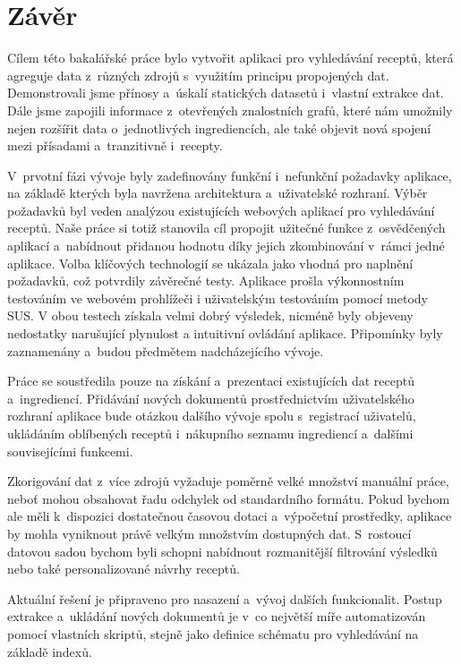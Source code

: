 \chapter*{Závěr}

Cílem této bakalářské práce bylo vytvořit aplikaci pro vyhledávání receptů, která agreguje data z~různých zdrojů s~využitím principu propojených dat. Demonstrovali jsme přínosy a~úskalí statických datasetů i~vlastní extrakce dat. Dále jsme zapojili informace z~otevřených znalostních grafů, které nám umožnily nejen rozšířit data o~jednotlivých ingrediencích, ale také objevit nová spojení mezi přísadami a~tranzitivně i~recepty.

V~prvotní fázi vývoje byly zadefinovány funkční i~nefunkční požadavky aplikace, na základě kterých byla navržena architektura a~uživatelské rozhraní. Výběr požadavků byl veden analýzou existujících webových aplikací pro vyhledávání receptů. Naše práce si totiž stanovila cíl propojit užitečné funkce z~osvědčených aplikací a~nabídnout přidanou hodnotu díky jejich zkombinování v~rámci jedné aplikace. Volba klíčových technologií se ukázala jako vhodná pro naplnění požadavků, což potvrdily závěrečné testy. Aplikace prošla výkonnostním testováním ve webovém prohlížeči i uživatelským testováním pomocí metody SUS. V obou testech získala velmi dobrý výsledek, nicméně byly objeveny nedostatky narušující plynulost a intuitivní ovládání aplikace. Připomínky byly zaznamenány a~budou předmětem nadcházejícího vývoje.

Práce se soustředila pouze na získání a~prezentaci existujících dat receptů a~ingrediencí. Přidávání nových dokumentů prostřednictvím uživatelského rozhraní aplikace bude otázkou dalšího vývoje spolu s~registrací uživatelů, ukládáním oblíbených receptů i~nákupního seznamu ingrediencí a~dalšími souvisejícími funkcemi.

Zkorigování dat z~více zdrojů vyžaduje poměrně velké množství manuální práce, neboť mohou obsahovat řadu odchylek od standardního formátu. Pokud bychom ale měli k~dispozici dostatečnou časovou dotaci a~výpočetní prostředky, aplikace by mohla vyniknout právě velkým množstvím dostupných dat. S~rostoucí datovou sadou bychom byli schopni nabídnout rozmanitější filtrování výsledků nebo také personalizované návrhy receptů.

Aktuální řešení je připraveno pro nasazení a~vývoj dalších funkcionalit. Postup extrakce a~ukládání nových dokumentů je v~co největší míře automatizován pomocí vlastních skriptů, stejně jako definice schématu pro vyhledávání na základě indexů.